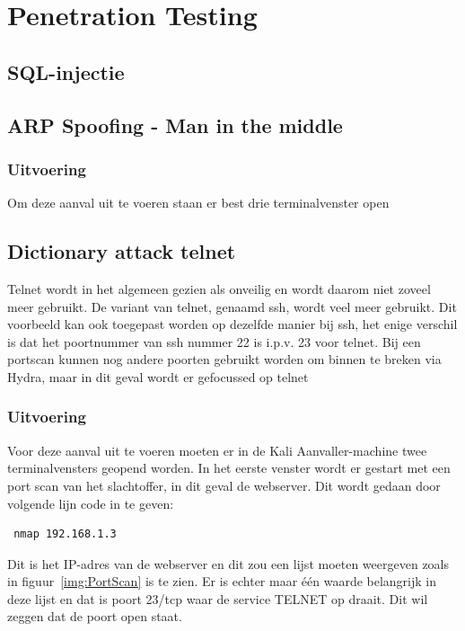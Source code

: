 \documentclass[pdftex,a4paper,12pt]{report}
\begin{document}
\chapter{Penetration Testing}

\section{SQL-injectie}



\section{ARP Spoofing - Man in the middle}


\subsection{Uitvoering}
Om deze aanval uit te voeren staan er best drie terminalvenster open



\section{Dictionary attack telnet}
Telnet wordt in het algemeen gezien als onveilig en wordt daarom niet zoveel meer gebruikt. De variant van telnet, genaamd ssh, wordt veel meer gebruikt. Dit voorbeeld kan ook toegepast worden op dezelfde manier bij ssh, het enige verschil is dat het poortnummer van ssh nummer 22 is i.p.v. 23 voor telnet. Bij een portscan kunnen nog andere poorten gebruikt worden om binnen te breken via Hydra, maar in dit geval wordt er gefocussed op telnet

\subsection{Uitvoering}
Voor deze aanval uit te voeren moeten er in de Kali Aanvaller-machine twee terminalvensters geopend worden. In het eerste venster wordt er gestart met een port scan van het slachtoffer, in dit geval de webserver. Dit wordt gedaan door volgende lijn code in te geven:
\begin{verbatim} nmap 192.168.1.3 \end{verbatim}
Dit is het IP-adres van de webserver en dit zou een lijst moeten weergeven zoals in figuur~\ref{img:PortScan} is te zien. Er is echter maar één waarde belangrijk in deze lijst en dat is poort 23/tcp waar de service TELNET op draait. Dit wil zeggen dat de poort open staat.
\end{document}
